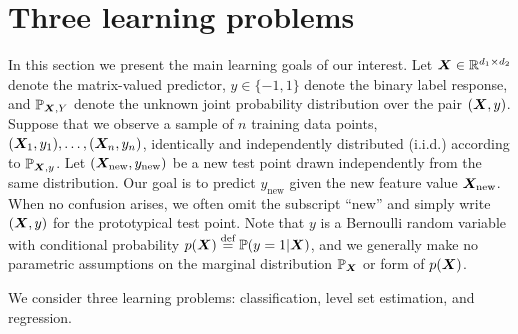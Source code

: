 \documentclass[11pt]{article}
\theoremstyle{definition}
\begin{document}
\vspace{-.5cm}
\section{Three learning problems}
\vspace{-.3cm}
In this section we present the main learning goals of our interest. Let $\bm X\in\mathbb{R}^{d_1\times d_2}$ denote the matrix-valued predictor, $y\in\{-1,1\}$ denote the binary label response, and $\mathbb{P}_{\bm X,Y}$ denote the unknown joint probability distribution over the pair $(\bm X,y)$. Suppose that we observe a sample of $n$ training data points, $(\bm X_1,y_1),\ldots,(\bm X_n,y_n)$, identically and independently distributed (i.i.d.) according to $\mathbb{P}_{\bm X,y}$. Let $(\bm X_{\text{new}},y_{\text{new}})$ be a new test point drawn independently from the same distribution. Our goal is to predict $y_{\text{new}}$ given the new feature value $\bm X_{\text{new}}$. When no confusion arises, we often omit the subscript ``new'' and simply write $(\bm X,y)$ for the prototypical test point. Note that  $y$ is a Bernoulli random variable with conditional probability $p(\bm X)\stackrel{\text{def}}{=}\mathbb{P}(y=1|\bm X)$, and we generally make no parametric assumptions on the marginal distribution $\mathbb{P}_{\bm X}$ or form of $p(\bm X)$. 


We consider three learning problems: classification, level set estimation, and regression. 
\end{document}

